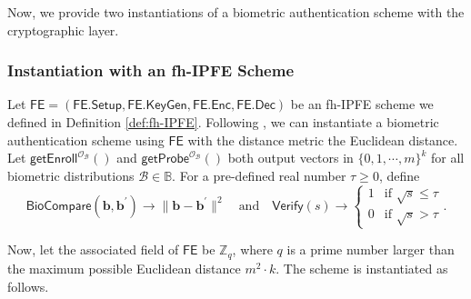 Now, we provide two instantiations of a biometric authentication scheme with the cryptographic layer.


\subsubsection{Instantiation with an fh-IPFE Scheme}
\label{sec:fh-IPFE-instantiation}

Let $\textsf{FE} = (\textsf{FE.Setup}, \textsf{FE.KeyGen}, \textsf{FE.Enc}, \textsf{FE.Dec})$ be an fh-IPFE scheme we defined in Definition \ref{def:fh-IPFE}. Following \cite{cryptoeprint:2023/481}, we can instantiate a biometric authentication scheme using $\textsf{FE}$ with the distance metric the Euclidean distance.
Let $\textsf{getEnroll}^{\mathcal{O}_{\mathcal{B}}}()$ and $\textsf{getProbe}^{\mathcal{O}_{\mathcal{B}}}()$ both output vectors in $ \{0, 1, \cdots, m \}^k$ for all biometric distributions $\mathcal{B} \in \mathbb{B}$. 
For a pre-defined real number $\tau \geq 0$, define
\[
	\textsf{BioCompare}(\mathbf{b}, \mathbf{b}^\prime) \to \| \mathbf{b} - \mathbf{b}^\prime\|^2 \quad \text{and} \quad 
	\textsf{Verify}(s) \to 
	\begin{cases} 
		1 & \text{if } \sqrt{s} \leq \tau \\
		0 & \text{if } \sqrt{s} > \tau
	\end{cases}.
\]

Now, let the associated field of $\textsf{FE}$ be $\mathbb{Z}_q$, where $q$ is a prime number larger than the maximum possible Euclidean distance $m^2 \cdot k$. The scheme is instantiated as follows.

